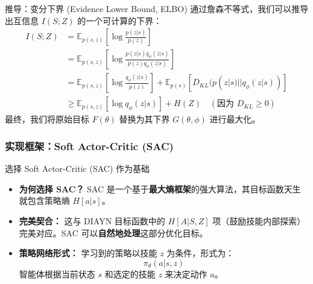 \documentclass{beamer}
\begin{document}
\begin{frame}
    \begin{block}{推导：变分下界 (Evidence Lower Bound, ELBO)}
        通过詹森不等式，我们可以推导出互信息 $I(S;Z)$ 的一个可计算的下界：
        \begin{align*}
            I(S; Z) &= \mathbb{E}_{p(s,z)}\left[\log \frac{p(z|s)}{p(z)}\right] \\
                    &= \mathbb{E}_{p(s,z)}\left[\log \frac{p(z|s)q_\phi(z|s)}{p(z)q_\phi(z|s)}\right] \\
                    &= \mathbb{E}_{p(s,z)}\left[\log \frac{q_\phi(z|s)}{p(z)}\right] + \mathbb{E}_{p(s)}\left[ D_{KL}(p(z|s) || q_\phi(z|s)) \right] \\
                    &\ge \mathbb{E}_{p(s,z)}\left[\log q_\phi(z|s)\right] + H(Z) \quad (\text{因为 } D_{KL} \ge 0)
        \end{align*}
        最终，我们将原始目标 $F(\theta)$ 替换为其下界 $G(\theta, \phi)$ 进行最大化。
    \end{block}

\end{frame}

\begin{frame}
     \frametitle{ 实现框架：Soft Actor-Critic (SAC)}

    \begin{alertblock}{选择 Soft Actor-Critic (SAC) 作为基础}
        \begin{itemize}
            \item \textbf{为何选择 SAC？} SAC 是一个基于\textbf{最大熵框架}的强大算法，其目标函数天生就包含策略熵 $H[a|s]$。
            
            \item \textbf{完美契合：} 这与 DIAYN 目标函数中的 $H[A|S,Z]$ 项（鼓励技能内部探索）完美对应。SAC 可以\textbf{自然地处理}这部分优化目标。
            
            \item \textbf{策略网络形式：} 学习到的策略以技能 $z$ 为条件，形式为：
            \[
                \pi_\theta(a | s, z)
            \]
            智能体根据当前状态 $s$ 和选定的技能 $z$ 来决定动作 $a$。
        \end{itemize}
    \end{alertblock}
\end{frame}
\end{document}
